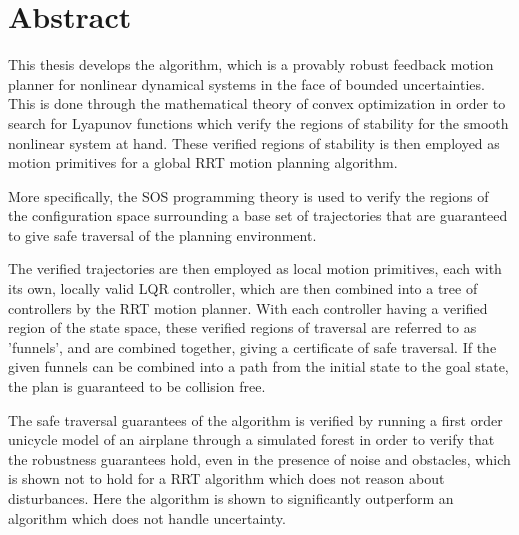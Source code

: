 \chapter*{Abstract}

\abstractintoc{} %
\abstractnum %


This thesis develops the \rrtfunnel{} algorithm, which is a provably robust
feedback motion planner for nonlinear dynamical systems in the face of bounded
uncertainties. This is done through the mathematical theory of convex
optimization in order to search for Lyapunov functions which verify the
regions of stability for the smooth nonlinear system at hand. These verified
regions of stability is then employed as motion primitives for a global
\ac{RRT} motion planning algorithm.

More specifically, the \ac{SOS} programming theory is used to verify the
regions of the configuration space surrounding a base set of trajectories that
are guaranteed to give safe traversal of the planning environment.

The verified trajectories are then employed as local motion primitives, each
with its own, locally valid \ac{LQR} controller, which are then combined into
a tree of controllers by the \ac{RRT} motion planner. With each controller
having a verified region of the state space, these verified regions of
traversal are referred to as 'funnels', and are combined together, giving a
certificate of safe traversal. If the given funnels can be combined into a
path from the initial state to the goal state, the plan is guaranteed to be
collision free.

The safe traversal guarantees of the algorithm is verified by running a first
order unicycle model of an airplane through a simulated forest in order to
verify that the robustness guarantees hold, even in the presence of noise and
obstacles, which is shown not to hold for a \ac{RRT} algorithm which does not
reason about disturbances. Here the \rrtfunnel{} algorithm is shown to
significantly outperform an algorithm which does not handle uncertainty.


